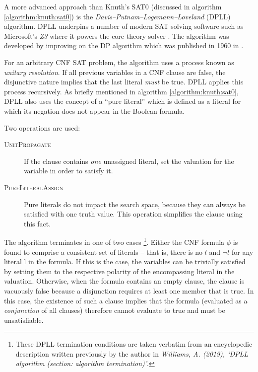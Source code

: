 \documentclass[a4paper,openany]{book}
\begin{document}
A more advanced approach than Knuth's SAT0 (discussed in algorithm \ref{algorithm:knuth:sat0}) is the \emph{Davis–Putnam–Logemann–Loveland} (DPLL) algorithm. DPLL underpins a number of modern SAT solving software such as Microsoft's \emph{Z3} where it powers the core theory solver \citep{de2008z3}. The algorithm was developed by improving on the DP algorithm which was published in 1960 in \citet{Davis:1960:CPQ:321033.321034}.

For an arbitrary CNF SAT problem, the algorithm uses a process known as \emph{unitary resolution}. If all previous variables in a CNF clause are false, the disjunctive nature implies that the last literal \emph{must} be true. DPLL applies this process recursively. As briefly mentioned in algorithm \ref{algorithm:knuth:sat0}, DPLL also uses the concept of a ``pure literal'' which is defined as a literal for which its negation does not appear in the Boolean formula.

Two operations are used:

\begin{description}
	\item[\textsc{UnitPropagate}] If the clause contains \emph{one} unassigned literal, set the valuation for the variable in order to satisfy it.
	\item[\textsc{PureLiteralAssign}] Pure literals do not impact the search space, because they can always be satisfied with one truth value. This operation simplifies the clause using this fact.
\end{description}

The algorithm terminates in one of two cases \footnote{These DPLL termination conditions are taken verbatim from an encyclopedic description written previously by the author in \emph{Williams, A. (2019), `DPLL algorithm (section: algorithm termination)'}.}. Either the CNF formula $\phi$ is found to comprise a consistent set of literals -- that is, there is no $l$ and $\neg l$ for any literal l in the formula. If this is the case, the variables can be trivially satisfied by setting them to the respective polarity of the encompassing literal in the valuation. Otherwise, when the formula contains an empty clause, the clause is vacuously false because a disjunction requires at least one member that is true. In this case, the existence of such a clause implies that the formula (evaluated as a \emph{conjunction} of all clauses) therefore cannot evaluate to true and must be unsatisfiable.
\end{document}
